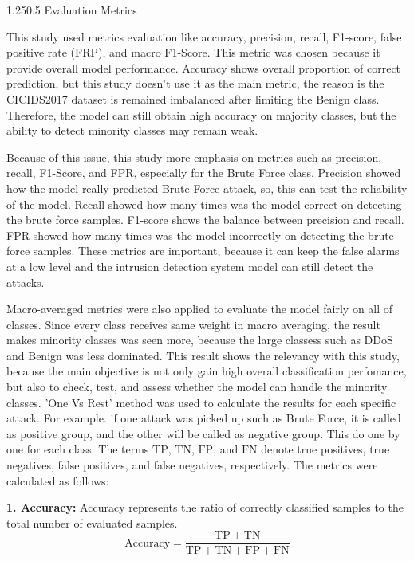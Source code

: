 \documentclass[12pt,a4paper]{article}
\makeatletter
\renewcommand{\subsection}{\@startsection{subsection}{2}{0pt}%
  {1.25\baselineskip}{0.5\baselineskip}%
  {\normalfont\fontsize{13}{15.6}\selectfont\bfseries}}
\makeatother
\begin{document}
\subsection{Evaluation Metrics}

This study used metrics evaluation like accuracy, precision, recall, F1-score, false positive rate (FRP), and macro F1-Score. This metric was chosen because it provide overall model performance. Accuracy shows overall proportion of correct prediction, but this study doesn't use it as the main metric, the reason is the CICIDS2017 dataset is remained imbalanced after limiting the Benign class. Therefore, the model can still obtain high accuracy on majority classes, but the ability to detect minority classes may remain weak. 

Because of this issue, this study more emphasis on metrics such as precision, recall, F1-Score, and FPR, especially for the Brute Force class. Precision showed how the model really predicted Brute Force attack, so, this can test the reliability of the model. Recall showed how many times was the model correct on detecting the brute force samples. F1-score shows the balance between precision and recall. FPR showed how many times was the model incorrectly on detecting the brute force samples. These metrics are important, because it can keep the false alarms at a low level and the intrusion detection system model can still detect the attacks.

Macro-averaged metrics were also applied to evaluate the model fairly on all of classes. Since every class receives same weight in macro averaging, the result makes minority classes was seen more, because the large classess such as DDoS and Benign was less dominated. This result shows the relevancy with this study, because the main objective is not only gain high overall classification perfomance, but also to check, test, and assess whether the model can handle the minority classes. 'One Vs Rest' method was used to calculate the results for each specific attack. For example. if one attack was picked up such as Brute Force, it is called as positive group, and the other will be called as negative group. This do one by one for each class. The terms \(\mathrm{TP}\), \(\mathrm{TN}\), \(\mathrm{FP}\), and \(\mathrm{FN}\) denote true positives, true negatives, false positives, and false negatives, respectively. The metrics were calculated as follows:

\noindent\textbf{1. Accuracy:} Accuracy represents the ratio of correctly classified samples to the total number of evaluated samples.
\begin{equation}
\mathrm{Accuracy} = \frac{\mathrm{TP}+\mathrm{TN}}{\mathrm{TP}+\mathrm{TN}+\mathrm{FP}+\mathrm{FN}}
\label{eq:accuracy}
\end{equation}
\end{document}
